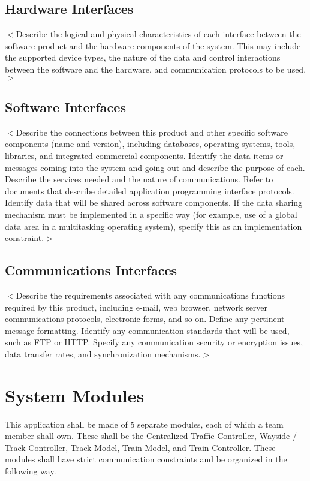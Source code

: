 \documentclass{scrreprt}
\begin{document}
\section{Hardware Interfaces}
$<$Describe the logical and physical characteristics of each interface between 
the software product and the hardware components of the system. This may include 
the supported device types, the nature of the data and control interactions 
between the software and the hardware, and communication protocols to be 
used.$>$

\section{Software Interfaces}
$<$Describe the connections between this product and other specific software 
components (name and version), including databases, operating systems, tools, 
libraries, and integrated commercial components. Identify the data items or 
messages coming into the system and going out and describe the purpose of each.  
Describe the services needed and the nature of communications. Refer to 
documents that describe detailed application programming interface protocols.  
Identify data that will be shared across software components. If the data 
sharing mechanism must be implemented in a specific way (for example, use of a 
global data area in a multitasking operating system), specify this as an 
implementation constraint.$>$

\section{Communications Interfaces}
$<$Describe the requirements associated with any communications functions 
required by this product, including e-mail, web browser, network server 
communications protocols, electronic forms, and so on. Define any pertinent 
message formatting. Identify any communication standards that will be used, such 
as FTP or HTTP. Specify any communication security or encryption issues, data 
transfer rates, and synchronization mechanisms.$>$


\chapter{System Modules}
This application shall be made of 5 separate modules, each of which a team member shall own.
These shall be the Centralized Traffic Controller, Wayside / Track Controller, Track Model, Train Model, and Train Controller.
These modules shall have strict communication constraints and be organized in the following way.
\end{document}
